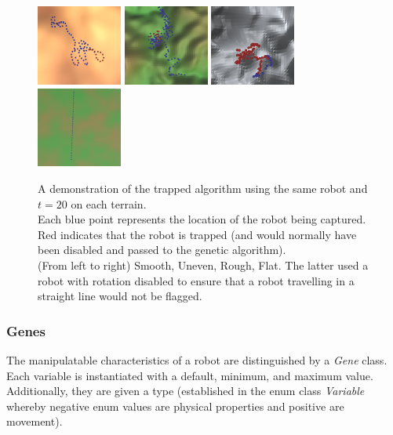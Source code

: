 \documentclass{article}
\begin{document}
\begin{figure}[H]
\centering
\centerline{
\includegraphics[width=0.25\textwidth]{trappedSmooth}
\includegraphics[width=0.25\textwidth]{trappedUneven}
\includegraphics[width=0.25\textwidth]{trappedRough}
\includegraphics[width=0.25\textwidth]{trappedFlat}
}
\caption{A demonstration of the trapped algorithm using the same robot and $t=20$ on each terrain.\\
Each blue point represents the location of the robot being captured. Red indicates that the robot is trapped (and would normally have been disabled and passed to the genetic algorithm).\\ 
(From left to right) Smooth, Uneven, Rough, Flat. The latter used a robot with rotation disabled to ensure that a robot travelling in a straight line would not be flagged.}
\label{fig:trappedPoints}
\end{figure}


\subsubsection{Genes}
\label{sec:Genes Imp}
The manipulatable characteristics of a robot are distinguished by a \textit{Gene} class. Each variable is instantiated with a default, minimum, and maximum value. Additionally, they are given a type (established in the enum class \textit{Variable} whereby negative enum values are physical properties and positive are movement). \\
\end{document}
